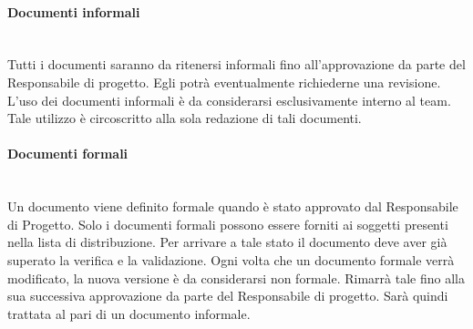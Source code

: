		\paragraph{Documenti informali} \mbox{}\\
		Tutti i documenti saranno da ritenersi informali fino all’approvazione da parte del Responsabile di progetto. Egli potrà eventualmente richiederne una revisione. L’uso dei documenti informali è da considerarsi esclusivamente interno al team. Tale utilizzo è circoscritto alla sola redazione di tali documenti.
		\paragraph{Documenti formali} \mbox{}\\
		Un documento viene definito formale quando è stato approvato dal	Responsabile di Progetto. Solo i documenti formali possono essere forniti ai soggetti presenti nella lista di distribuzione. Per arrivare a tale stato il documento deve aver già superato la verifica e la validazione.
		Ogni volta che un documento formale verrà modificato, la nuova
		versione è da considerarsi non formale. Rimarrà tale fino alla sua successiva approvazione da parte del Responsabile di progetto. Sarà quindi trattata al pari di un documento informale.
